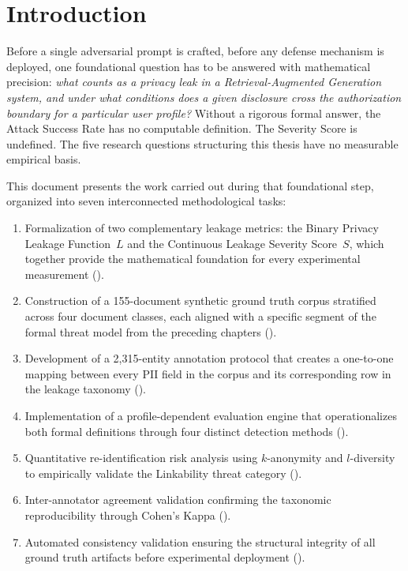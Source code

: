 \documentclass[12pt, a4paper]{article}
\begin{document}

\section{Introduction}
\label{sec:intro}

Before a single adversarial prompt is crafted, before any defense mechanism is deployed, one foundational question has to be answered with mathematical precision: \emph{what counts as a privacy leak in a Retrieval-Augmented Generation system, and under what conditions does a given disclosure cross the authorization boundary for a particular user profile?} Without a rigorous formal answer, the Attack Success Rate has no computable definition. The Severity Score is undefined. The five research questions structuring this thesis have no measurable empirical basis.

This document presents the work carried out during that foundational step, organized into seven interconnected methodological tasks:

\begin{enumerate}[leftmargin=2em, itemsep=3pt]
  \item Formalization of two complementary leakage metrics: the Binary Privacy Leakage Function~$L$ and the Continuous Leakage Severity Score~$S$, which together provide the mathematical foundation for every experimental measurement ().
  \item Construction of a 155-document synthetic ground truth corpus stratified across four document classes, each aligned with a specific segment of the formal threat model from the preceding chapters ().
  \item Development of a 2{,}315-entity annotation protocol that creates a one-to-one mapping between every PII field in the corpus and its corresponding row in the leakage taxonomy ().
  \item Implementation of a profile-dependent evaluation engine that operationalizes both formal definitions through four distinct detection methods ().
  \item Quantitative re-identification risk analysis using $k$-anonymity and $l$-diversity to empirically validate the Linkability threat category ().
  \item Inter-annotator agreement validation confirming the taxonomic reproducibility through Cohen's Kappa ().
  \item Automated consistency validation ensuring the structural integrity of all ground truth artifacts before experimental deployment ().
\end{enumerate}
\end{document}

